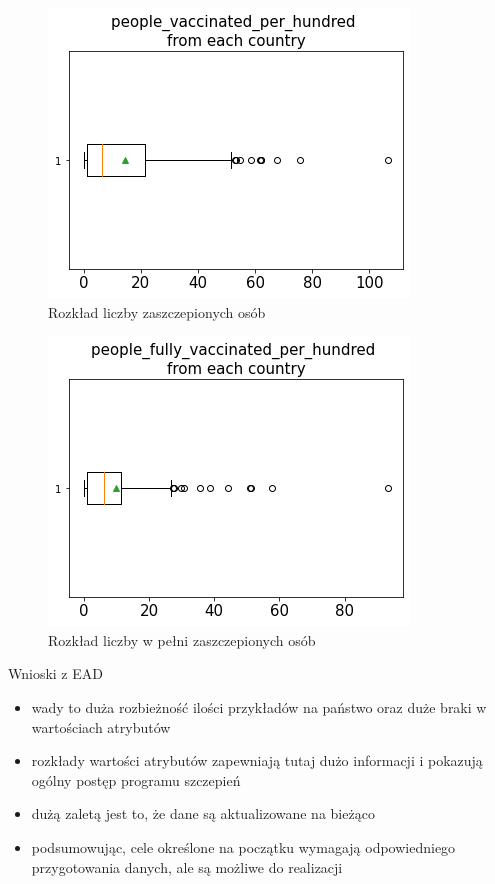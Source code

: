 \documentclass[11pt]{beamer}
\begin{document}

\begin{frame}
\begin{figure}[!ht]
\centering
\includegraphics[scale=0.5]{../img/box_people_vaccinated.png} 
\caption{Rozkład liczby zaszczepionych osób}
\label{Rys:boxPeopleVacc}
\end{figure}
\end{frame}

 
\begin{frame}
\begin{figure}[h]
\centering
\includegraphics[scale=0.5]{../img/box_fully_vaccinated.png} 
\caption{Rozkład liczby w pełni zaszczepionych osób}
\label{Rys:boxFullyVacc}
\end{figure}
\end{frame}


\begin{frame}{Wnioski z EAD}
\begin{itemize}
\item wady to duża rozbieżność ilości przykładów na państwo oraz duże braki w wartościach atrybutów
\item rozkłady wartości atrybutów zapewniają tutaj dużo informacji i pokazują ogólny postęp programu szczepień
\item dużą zaletą jest to, że dane są aktualizowane na bieżąco
\item podsumowując, cele określone na początku wymagają odpowiedniego przygotowania danych, ale są możliwe do realizacji
\end{itemize}
\end{frame}
\end{document}
